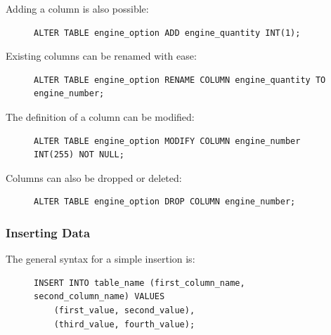 \documentclass[9pt]{article}
\begin{document}
Adding a column is also possible:

\begin{figure}[H]
\begin{verbatim}
ALTER TABLE engine_option ADD engine_quantity INT(1);
\end{verbatim}
\end{figure}

Existing columns can be renamed with ease:

\begin{figure}[H]
\begin{verbatim}
ALTER TABLE engine_option RENAME COLUMN engine_quantity TO engine_number;
\end{verbatim}
\end{figure}

The definition of a column can be modified:

\begin{figure}[H]
\begin{verbatim}
ALTER TABLE engine_option MODIFY COLUMN engine_number INT(255) NOT NULL;
\end{verbatim}
\end{figure}

Columns can also be dropped or deleted:

\begin{figure}[H]
\begin{verbatim}
ALTER TABLE engine_option DROP COLUMN engine_number;
\end{verbatim}
\end{figure}

\subsubsection{Inserting Data}
\label{sec:org8757107}

The general syntax for a simple insertion is:

\begin{figure}[H]
\begin{verbatim}
INSERT INTO table_name (first_column_name, second_column_name) VALUES
    (first_value, second_value),
    (third_value, fourth_value);
\end{verbatim}
\end{figure}
\end{document}
